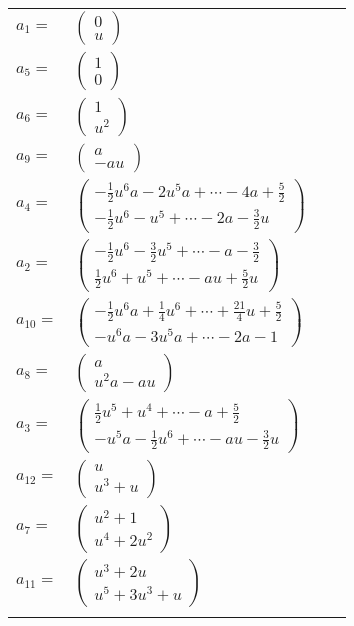 \documentclass[1p]{elsarticle_modified}
\theoremstyle{definition}
\begin{document}
\begin{tabular}{m{7pt} m{180pt} m{7pt} m{180pt} }
\flushright $a_{1}=$&$\begin{pmatrix}0\\u\end{pmatrix}$ \\
\flushright $a_{5}=$&$\begin{pmatrix}1\\0\end{pmatrix}$ \\
\flushright $a_{6}=$&$\begin{pmatrix}1\\u^2\end{pmatrix}$ \\
\flushright $a_{9}=$&$\begin{pmatrix}a\\- a u\end{pmatrix}$ \\
\flushright $a_{4}=$&$\begin{pmatrix}-\frac{1}{2} u^6 a-2 u^5 a+\cdots-4 a+\frac{5}{2}\\-\frac{1}{2} u^6- u^5+\cdots-2 a-\frac{3}{2} u\end{pmatrix}$ \\
\flushright $a_{2}=$&$\begin{pmatrix}-\frac{1}{2} u^6-\frac{3}{2} u^5+\cdots- a-\frac{3}{2}\\\frac{1}{2} u^6+u^5+\cdots- a u+\frac{5}{2} u\end{pmatrix}$ \\
\flushright $a_{10}=$&$\begin{pmatrix}-\frac{1}{2} u^6 a+\frac{1}{4} u^6+\cdots+\frac{21}{4} u+\frac{5}{2}\\- u^6 a-3 u^5 a+\cdots-2 a-1\end{pmatrix}$ \\
\flushright $a_{8}=$&$\begin{pmatrix}a\\u^2 a- a u\end{pmatrix}$ \\
\flushright $a_{3}=$&$\begin{pmatrix}\frac{1}{2} u^5+u^4+\cdots- a+\frac{5}{2}\\- u^5 a-\frac{1}{2} u^6+\cdots- a u-\frac{3}{2} u\end{pmatrix}$ \\
\flushright $a_{12}=$&$\begin{pmatrix}u\\u^3+u\end{pmatrix}$ \\
\flushright $a_{7}=$&$\begin{pmatrix}u^2+1\\u^4+2 u^2\end{pmatrix}$ \\
\flushright $a_{11}=$&$\begin{pmatrix}u^3+2 u\\u^5+3 u^3+u\end{pmatrix}$\\&\end{tabular}
\end{document}

